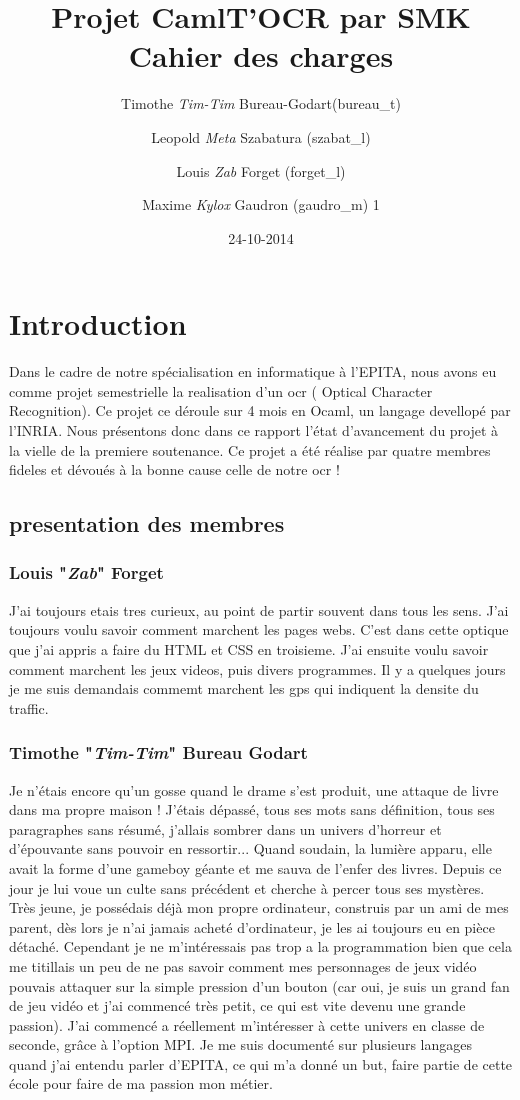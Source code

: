 \documentclass{article}
\title{Projet CamlT'OCR par SMK \\ Cahier des charges}
\date{24-10-2014}
\author{
    Timothe \textit{Tim-Tim} Bureau-Godart(bureau\_t) \and
        Leopold \textit{Meta} Szabatura (szabat\_l) \and
        Louis \textit{Zab} Forget (forget\_l) \and
        Maxime \textit{Kylox} Gaudron (gaudro\_m)
        1      }
\begin{document}
\maketitle
\tableofcontents
\newpage
\section{Introduction}
Dans le cadre de notre spécialisation en informatique à l'EPITA, nous avons eu comme projet semestrielle la realisation d'un ocr ( Optical Character Recognition). Ce projet ce déroule sur 4 mois en Ocaml, un langage devellopé par l'INRIA. Nous présentons donc dans ce rapport l'état d'avancement du projet à la vielle de la premiere soutenance. Ce projet a été réalise par quatre membres fideles et dévoués à la bonne cause celle de notre ocr ! 
\subsection{presentation des membres}
\subsubsection{Louis "\textit{Zab}" Forget}
J'ai toujours etais tres curieux, au point de partir souvent dans tous les sens. J'ai toujours voulu savoir comment marchent les pages webs. C'est dans cette optique que j'ai appris a faire du HTML et CSS en troisieme. J'ai ensuite voulu savoir comment marchent les jeux videos, puis divers programmes. Il y a quelques jours je me suis demandais commemt marchent les gps qui indiquent la densite du traffic.
\subsubsection{Timothe "\textit{Tim-Tim}" Bureau Godart}
Je n'étais encore qu'un gosse quand le drame s'est produit, une attaque de livre dans ma propre maison ! J'étais dépassé, tous ses mots sans définition, tous ses paragraphes sans résumé, j'allais sombrer dans un univers d'horreur et d'épouvante sans pouvoir en ressortir... Quand soudain, la lumière apparu, elle avait la forme d'une gameboy géante et me sauva de l'enfer des livres. Depuis ce jour je lui voue un culte sans précédent et cherche à percer tous ses mystères.
Très jeune, je possédais déjà mon propre ordinateur, construis par un ami de mes parent, dès lors je n'ai jamais acheté d'ordinateur, je les ai toujours eu en pièce détaché. Cependant je ne m'intéressais pas trop a la programmation bien que cela me titillais un peu de ne pas savoir comment mes personnages de jeux vidéo pouvais attaquer sur la simple pression d'un bouton (car oui, je suis un grand fan de jeu vidéo et j'ai commencé très petit, ce qui est vite devenu une grande passion). J'ai commencé a réellement m'intéresser à cette univers en classe de seconde, grâce à l'option MPI. Je me suis documenté sur plusieurs langages quand j'ai entendu parler d'EPITA, ce qui m'a donné un but, faire partie de cette école pour faire de ma passion mon métier.
\end{document}
